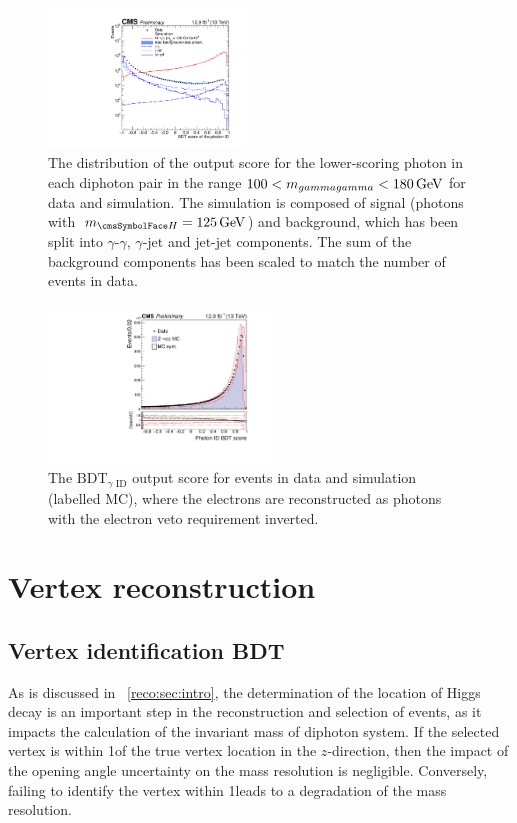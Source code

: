 \begin{figure}[hptb]
\centering \hspace{0.1cm}
\includegraphics[width=0.47\textwidth]{recoFigures/validation_phoID_ICHEP_4sideTicks.pdf}
\caption{
The distribution of the \PhoIdBdt output score for the lower-scoring photon in each diphoton pair in the range $100 < m_{gamma gamma} < 180\,\text{Ge\hspace{-.08em}V}$ for data and simulation. The simulation is composed of signal (\Hgg photons with $\mH=125\GeV$) and background, which has been split into $\gamma$-$\gamma$, $\gamma$-$\textrm{jet}$ and $\textrm{jet}$-$\textrm{jet}$ components. The sum of the background components has been scaled to match the number of events in data.}
\label{fig:reco:photon_id_score_hgg_bkg}
\end{figure}

\begin{figure}[hptb]
\centering 
\includegraphics[width=0.53\textwidth]{recoFigures/idmva_syst_combined.pdf}
\caption{ The $\text{BDT}_{\gamma\text{ ID}}$ output score for \Zee events in data and simulation (labelled MC), where 
the electrons are reconstructed as photons with the electron veto requirement inverted.}
\label{fig:reco:photon_id_zee_validation}
\end{figure}


\section{Vertex reconstruction}
\label{reco:sec:vertex}

\subsection{Vertex identification BDT}
As is discussed in \Sec~\ref{reco:sec:intro}, the determination of the location of Higgs decay is an important step in the reconstruction and selection of \Hgg events, as it impacts the calculation of the invariant mass of diphoton system. If the selected vertex is within 1\cm of the true vertex location in the $z$-direction, then the impact of the opening angle uncertainty on the mass resolution is negligible. Conversely, failing to identify the vertex within 1\cm leads to a degradation of the mass resolution. %

